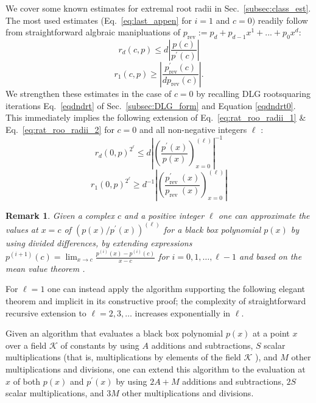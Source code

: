 \documentclass[sigconf]{acmart}
\newtheorem{remark}{Remark}
\begin{document}
We cover some known estimates for extremal root radii in Sec.~\ref{subsec:class_est}. The most used estimates (Eq.~\ref{eq:last_appen} for $i=1$ and $c=0)$ readily follow from straightforward algbraic manipluations of $p_\text{rev}:=p_d+p_{d-1}x^1+...+p_0x^d$:
\begin{equation}\label{eq:rat_roo_radii_1}
r_{d}(c, p) \leq d\left|\frac{p(c)}{p^{\prime}(c)}\right|
\end{equation}
\begin{equation}\label{eq:rat_roo_radii_2}
 r_{1}(c, p) \geq\left|\frac{p_{\mathrm{rev}}^{\prime}(c)}{d p_{\mathrm{rev}}(c)}\right| .
\end{equation}
We strengthen these estimates in the case of $c=0$ by recalling DLG rootsquaring iterations Eq.~\ref{eqdndrt} of Sec.~\ref{subsec:DLG_form} and Equation \ref{eqdndrt0}. This immediately implies the following extension of Eq.~\ref{eq:rat_roo_radii_1} \& Eq.~\ref{eq:rat_roo_radii_2} for $c=0$ and all non-negative integers $\ell$ :
\begin{equation}\label{eq:rat_roo_radii_3}
r_{d}(0, p)^{2^{\ell}} \leq d \left|\left(\frac{p^{\prime}(x)}{p(x)}\right)_{x=0}^{(\ell)}\right|^{-1}
\end{equation}
\begin{equation}\label{eq:rat_roo_radii_4}
r_{1}(0, p)^{2^{\ell}} \geq d^{-1}\left|\left(\frac{ p^{\prime}_{\text {rev }}(x)}{p_{\text {rev }}(x)}\right)_{x=0}^{(\ell)}\right|
\end{equation}
\begin{remark}\label{rem:fin_diff}
 Given a complex $c$ and a positive integer $\ell$ one can approximate the values at $x=c$ of $\left(p(x) / p^{\prime}(x)\right)^{(\ell)}$ for a black box polynomial $p(x)$ by using divided differences, by extending expressions $p^{(i+1)}(c)=\lim _{x \rightarrow c} \frac{p^{(i)}(x)-p^{(i)}(c)}{x-c}$ for $i=0,1, \ldots, \ell-1$ and based on the mean value theorem \cite{Boor1995DividedD}.
\end{remark}

For $\ell=1$ one can instead apply the algorithm supporting the following elegant theorem and implicit in its constructive proof; the complexity of straightforward recursive extension to $\ell=2,3, \ldots$ increases exponentially in $\ell$.

\begin{theorem}
Given an algorithm that evaluates a black box polynomial $p(x)$ at a point $x$ over a field $\mathcal{K}$ of constants by using $A$ additions and subtractions, $S$ scalar multiplications (that is, multiplications by elements of the field $\mathcal{K}$ ), and $M$ other multiplications and divisions, one can extend this algorithm to the evaluation at $x$ of both $p(x)$ and $p^{\prime}(x)$ by using $2 A+M$ additions and subtractions, $2 S$ scalar multiplications, and $3 M$ other multiplications and divisions.
\end{theorem}
\end{document}
